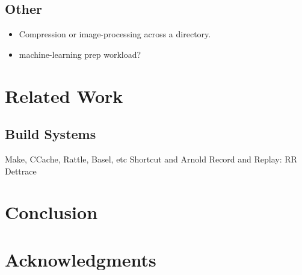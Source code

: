 \subsection{Other}

\begin{itemize}
    \item Compression or image-processing across a directory.
    \item machine-learning prep workload?
\end{itemize}

\section{Related Work}
\subsection{Build Systems}
Make, CCache, Rattle, Basel, etc
Shortcut and Arnold
Record and Replay: RR
Dettrace

\section{Conclusion}
\section{Acknowledgments}
